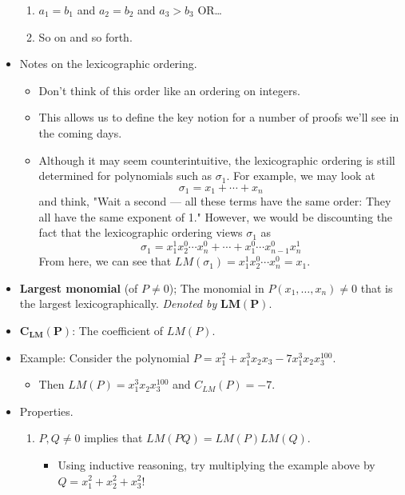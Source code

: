 \documentclass[../notes.tex]{subfiles}
\begin{document}
\begin{itemize}
\begin{enumerate}
        \item $a_1=b_1$ and $a_2=b_2$ and $a_3>b_3$ OR\dots
        \item So on and so forth.
    \end{enumerate}
    \item Notes on the lexicographic ordering.
    \begin{itemize}
        \item Don't think of this order like an ordering on integers.
        \item This allows us to define the key notion for a number of proofs we'll see in the coming days.
        \item Although it may seem counterintuitive, the lexicographic ordering is still determined for polynomials such as $\sigma_1$. For example, we may look at
        \begin{equation*}
            \sigma_1 = x_1+\cdots+x_n
        \end{equation*}
        and think, "Wait a second --- all these terms have the same order: They all have the same exponent of 1." However, we would be discounting the fact that the lexicographic ordering views $\sigma_1$ as
        \begin{equation*}
            \sigma_1 = x_1^1x_2^0\cdots x_n^0+\cdots+x_1^0\cdots x_{n-1}^0x_n^1
        \end{equation*}
        From here, we can see that $LM(\sigma_1)=x_1^1x_2^0\cdots x_n^0=x_1$.
    \end{itemize}
    \item \textbf{Largest monomial} (of $P\neq 0$); The monomial in $P(x_1,\dots,x_n)\neq 0$ that is the largest lexicographically. \emph{Denoted by} $\bm{LM(P)}$.
    \item $\bm{C_{LM}(P)}$: The coefficient of $LM(P)$.
    \item Example: Consider the polynomial $P=x_1^2+x_1^3x_2x_3-7x_1^3x_2x_3^{100}$.
    \begin{itemize}
        \item Then $LM(P)=x_1^3x_2x_3^{100}$ and $C_{LM}(P)=-7$.
    \end{itemize}
    \item Properties.
    \begin{enumerate}
        \item $P,Q\neq 0$ implies that $LM(PQ)=LM(P)LM(Q)$.
        \begin{itemize}
            \item Using inductive reasoning, try multiplying the example above by $Q=x_1^2+x_2^2+x_3^2$!

\end{itemize}
\end{enumerate}
\end{itemize}
\end{document}
